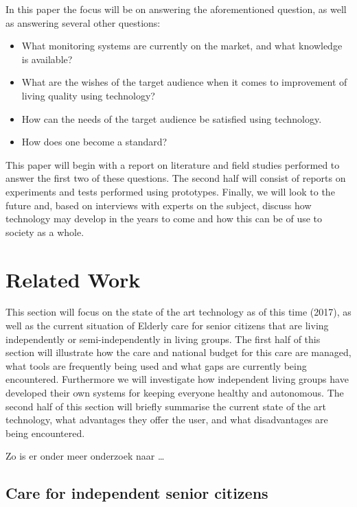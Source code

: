 \documentclass{below-ext}
\begin{document}
In this paper the focus will be on answering the aforementioned question, as well as answering several other questions:
\begin{itemize}
\item What monitoring systems are currently on the market, and what knowledge is available?
\item  What are the wishes of the target audience when it comes to improvement of living quality using technology?
\item How can the needs of the target audience be satisfied using technology.
\item How does one become a standard?
\end{itemize}

This paper will begin with a report on literature and field studies performed to answer the first two of these questions. The second half will consist of reports on experiments and tests performed using prototypes. Finally, we will look to the future and, based on interviews with experts on the subject, discuss how technology may develop in the years to come and how this can be of use to society as a whole.

\section{Related Work}
This section will focus on the state of the art technology as of this time (2017), as well as the current situation of Elderly care for senior citizens that are living independently or semi-independently in living groups. The first half of this section will illustrate how the care and national budget for this care are managed, what tools are frequently being used and what gaps are currently being encountered. Furthermore we will investigate how independent living groups have developed their own systems for keeping everyone healthy and autonomous. The second half of this section will briefly summarise the current state of the art technology, what advantages they offer the user, and what disadvantages are being encountered.

Zo is er onder meer onderzoek naar \ldots

\subsection{Care for independent senior citizens}
\end{document}
